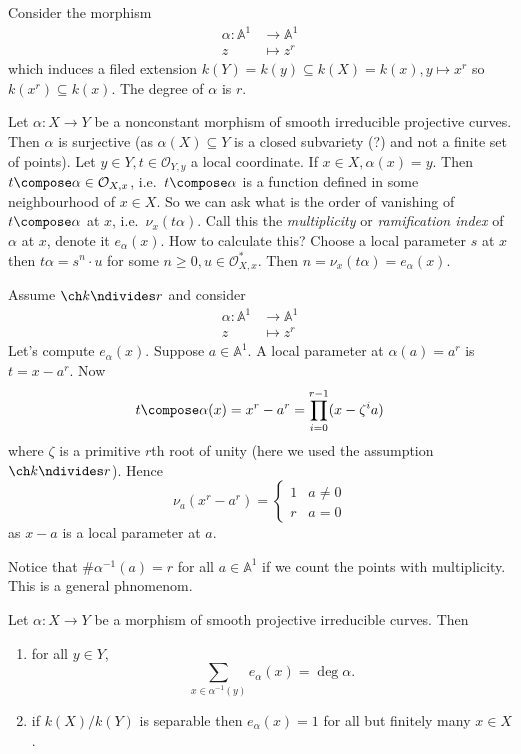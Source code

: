 \documentclass[a4paper]{article}
\renewcommand{\A}{\mathbb{A}}
\begin{document}
\begin{eg}
  Consider the morphism
  \begin{align*}
    \alpha: \A^1 &\to \A^1 \\
    z &\mapsto z^r
  \end{align*}
  which induces a filed extension \(k(Y) = k(y) \subseteq k(X) = k(x), y \mapsto x^r\) so \(k(x^r) \subseteq k(x)\). The degree of \(\alpha\) is \(r\).
\end{eg}

Let \(\alpha: X \to Y\) be a nonconstant morphism of smooth irreducible projective curves. Then \(\alpha\) is surjective (as \(\alpha(X) \subseteq Y\) is a closed subvariety (?) and not a finite set of points). Let \(y \in Y, t \in \mathcal O_{Y, y}\) a local coordinate. If \(x \in X, \alpha(x) = y\). Then \(t \compose \alpha \in \mathcal O_{X, x}\), i.e.\ \(t \compose \alpha\) is a function defined in some neighbourhood of \(x \in X\). So we can ask what is the order of vanishing of \(t \compose \alpha\) at \(x\), i.e.\ \(\nu_x(t\alpha)\). Call this the \emph{multiplicity} or \emph{ramification index} of \(\alpha\) at \(x\), denote it \(e_\alpha(x)\). How to calculate this? Choose a local parameter \(s\) at \(x\) then \(t\alpha = s^n \cdot u\) for some \(n \geq 0, u \in \mathcal O_{X, x}^*\). Then \(n = \nu_x(t\alpha) = e_\alpha(x)\).

\begin{eg}
  Assume \(\ch k \ndivides r\) and consider
  \begin{align*}
    \alpha: \A^1 &\to \A^1 \\
    z &\mapsto z^r
  \end{align*}
  Let's compute \(e_\alpha(x)\). Suppose \(a \in \A^1\). A local parameter at \(\alpha(a) = a^r\) is \(t = x - a^r\). Now
  \[
    t \compose \alpha(x) = x^r - a ^r = \prod_{i = 0}^{r - 1} (x - \zeta^ia)
  \]
  where \(\zeta\) is a primitive \(r\)th root of unity (here we used the assumption \(\ch k \ndivides r\)). Hence
  \[
    \nu_a (x^r - a^r) =
    \begin{cases}
      1 & a \neq 0 \\
      r & a = 0
    \end{cases}
  \]
  as \(x - a\) is a local parameter at \(a\).

  Notice that \(\# \alpha^{-1}(a) = r\) for all \(a \in \A^1\) if we count the points with multiplicity. This is a general phnomenom.
\end{eg}

\begin{theorem}
  Let \(\alpha: X \to Y\) be a morphism of smooth projective irreducible curves. Then
  \begin{enumerate}
  \item for all \(y \in Y\),
    \[
      \sum_{x \in \alpha^{-1}(y)} e_\alpha(x) = \deg \alpha.
    \]
  \item if \(k(X)/k(Y)\) is separable then \(e_\alpha(x) = 1\) for all but finitely many \(x \in X\).
  \end{enumerate}
\end{theorem}
\end{document}
